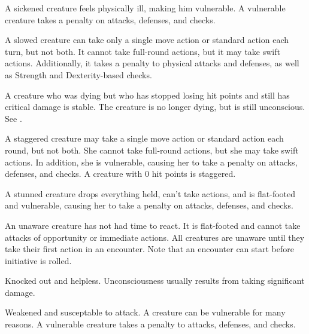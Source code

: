  A sickened creature feels physically ill, making him vulnerable. A vulnerable creature takes a  penalty on attacks, defenses, and checks.

 A slowed creature can take only a single move action or standard action each turn, but not both. It cannot take full-round actions, but it may take swift actions. Additionally, it takes a  penalty to physical attacks and defenses, as well as Strength and Dexterity-based checks.

 A creature who was dying but who has stopped losing hit points and still has critical damage is stable. The creature is no longer dying, but is still unconscious. See .

 A staggered creature may take a single move action or standard action each round, but not both. She cannot take full-round actions, but she may take swift actions. In addition, she is vulnerable, causing her to take a  penalty on attacks, defenses, and checks. A creature with 0 hit points is staggered.

 A stunned creature drops everything held, can't take actions, and is flat-footed and vulnerable, causing her to take a  penalty on attacks, defenses, and checks.

 An unaware creature has not had time to react. It is flat-footed and cannot take attacks of opportunity or immediate actions. All creatures are unaware until they take their first action in an encounter. Note that an encounter can start before initiative is rolled.

 Knocked out and helpless. Unconsciousness usually results from taking significant damage. 

 Weakened and susceptable to attack. A creature can be vulnerable for many reasons. A vulnerable creature takes a  penalty to attacks, defenses, and checks.
